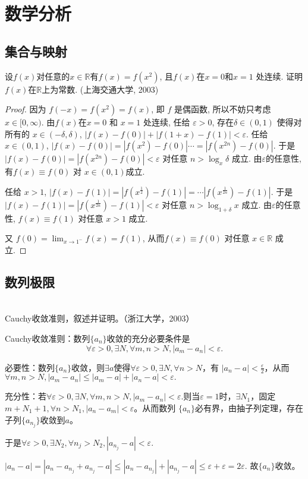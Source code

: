 \chapter{数学分析}



\section{集合与映射}

\begin{example}
  \label{20151012-190708}
设$f(x)$对任意的$x\in \mathbb{R}$有$f(x)=f(x^2)$, 且$f(x)$在$x=0$和$x=1$ 处连续. 证明$f(x)$在$\mathbb{R}$上为常数. (上海交通大学, 2003)
\end{example}

\begin{proof}
因为 $f(-x)= f(x^2) = f(x)$, 即 $f$ 是偶函数, 所以不妨只考虑 $x\in[0,\infty)$.
由$f(x)$在$x=0$ 和 $x=1$ 处连续, 
任给 $\varepsilon>0$, 存在$\delta\in(0,1)$ 使得对所有的 $x\in(-\delta,\delta)$, 
$|f(x)-f(0)| + |f(1+x)-f(1)| < \varepsilon$. 
任给 $x\in(0,1)$, $|f(x)-f(0)|=|f(x^2)-f(0)|\cdots=|f(x^{2n})-f(0)|$.
于是 $|f(x)-f(0)|=|f(x^{2n})-f(0)|<\varepsilon$ 对任意 $n> \log_x \delta$ 成立.
由$\varepsilon$的任意性, 有$f(x)\equiv f(0)$ 对 $x\in(0,1)$成立.

任给 $x>1$, $|f(x)-f(1)|=|f(x^{\frac12})-f(1)|=\cdots|f(x^{\frac1{2n}})-f(1)|$. 
于是 $|f(x)-f(1)|=|f(x^{\frac1{2n}})-f(1)|<\varepsilon$ 对任意 $n> \log_{1+\delta}x$ 成立.
由$\varepsilon$的任意性, $f(x) \equiv f(1)$ 对任意 $x>1$ 成立.

又 $f(0)=\lim_{x\rightarrow1^-}f(x)=f(1)$, 
从而$f(x)\equiv f(0)$ 对任意 $x\in \mathbb{R}$ 成立.
\end{proof}

\section{数列极限}
  \begin{example}
  \hfill\\
   Cauchy收敛准则，叙述并证明。（浙江大学，2003）

  Cauchy收敛准则：数列$\{a_n\}$收敛的充分必要条件是$$\forall\varepsilon>0,\exists N,\forall m,n>N,|a_m-a_n|<\varepsilon.$$
  
  必要性：数列$\{a_n\}$收敛，则$\exists a$使得$\forall\varepsilon>0,\exists N,\forall n>N$，有
  $|a_n-a|<\frac{\varepsilon}2$，从而$\forall m,n>N,|a_m-a_n|\leq|a_m-a|+|a_n-a|<\varepsilon.$
  
  充分性：若$\forall\varepsilon>0,\exists N,\forall m,n>N,|a_m-a_n|<\varepsilon.$则当$\varepsilon=1$时，$\exists N_1$，固定$m+N_1+1,\forall n>N_1,|a_n-a_m|<\varepsilon$。从而数列
  $\{a_n\}$必有界，由抽子列定理，存在子列$\{a_{n_j}\}$收敛到$a$。
  
  于是$\forall\varepsilon>0,\exists N_2,\forall n_j>N_2,|a_{n_j}-a|<\varepsilon.$
  
  $|a_n-a|=|a_n-a_{n_j}+a_{n_j}-a|\leq|a_n-a_{n_j}|+|a_{n_j}-a|\leq\varepsilon+\varepsilon=2\varepsilon.$
  故$\{a_n\}$收敛。

\end{example}


